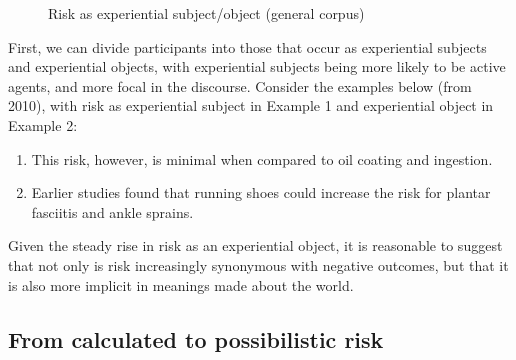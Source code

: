 \begin{figure}[htb!]
\centering
{}
\caption{Risk as experiential subject\slash object (general corpus)}
\end{figure}

First, we can divide participants into those that occur as experiential subjects and experiential objects, with experiential subjects being more likely to be active agents, and more focal in the discourse. Consider the examples below (from 2010), with risk as experiential subject in Example 1 and experiential object in Example 2:

\begin{enumerate} [before=\color{black}\ttfamily] \setlength\itemsep{0em} \small
\item This risk, however, is minimal when compared to oil coating and ingestion.
\item Earlier studies found that running shoes could increase the risk for plantar fasciitis and ankle sprains.
\end{enumerate}

Given the steady rise in risk as an experiential object, it is reasonable to suggest that not only is risk increasingly synonymous with negative outcomes, but that it is also more implicit in meanings made about the world.

\subsection{From calculated to possibilistic risk}

